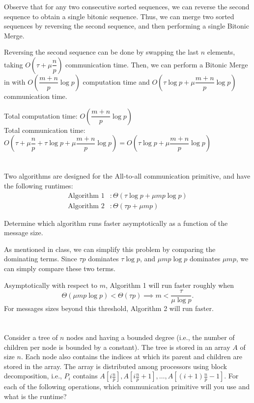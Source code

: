 \documentclass{article}
\begin{document}
\quad Observe that for any two consecutive sorted sequences, we can reverse the second sequence to obtain a single bitonic sequence.
Thus, we can merge two sorted sequences by reversing the second sequence, and then performing a single Bitonic Merge.

Reversing the second sequence can be done by swapping the last $n$ elements, taking $O(\tau + \mu\dfrac{n}{p})$ communication time.
Then, we can perform a Bitonic Merge in with $O(\dfrac{m+n}{p}\log{p})$ computation time and $O(\tau\log{p} + \mu\dfrac{m+n}{p}\log{p})$ communication time.

Total computation time: $O(\dfrac{m+n}{p}\log{p})$\\
Total communication time: $O(\tau + \mu\dfrac{n}{p} + \tau\log{p} + \mu\dfrac{m+n}{p}\log{p}) = O(\tau\log{p} + \mu\dfrac{m+n}{p}\log{p})$

\section{}
Two algorithms are designed for the All-to-all communication primitive, and have
the following runtimes:
\begin{align*}
  \text{Algorithm 1} &:\Theta\left(\tau\log{p} + \mu m p \log{p}\right)\\
  \text{Algorithm 2} &:\Theta\left(\tau p + \mu m p\right)
\end{align*}

Determine which algorithm runs faster asymptotically as a function of the message size.

\quad As mentioned in class, we can simplify this problem by comparing the dominating terms.
Since $\tau p$ dominates $\tau \log{p}$, and $\mu m p \log{p}$ dominates $\mu m p$, we can simply compare these two terms.

Asymptotically with respect to $m$, Algorithm 1 will run faster roughly when
$$\Theta(\mu mp \log{p}) < \Theta(\tau p) \implies m < \dfrac{\tau}{\mu\log{p}}.$$
For messages sizes beyond this threshold, Algorithm 2 will run faster.

\section{}
Consider a tree of $n$ nodes and having a bounded degree (i.e., the number of children per node is bounded by a constant).
The tree is stored in an array $A$ of size $n$.
Each node also contains the indices at which its parent and children are stored in the array.
The array is distributed among processors using block decomposition, i.e., $P_i$ contains $A[i\frac{n}{p}],A[i\frac{n}{p} + 1], \dots, A[(i + 1)\frac{n}{p} - 1].$
For each of the following operations, which communication primitive will you use and what is the runtime?
\end{document}
